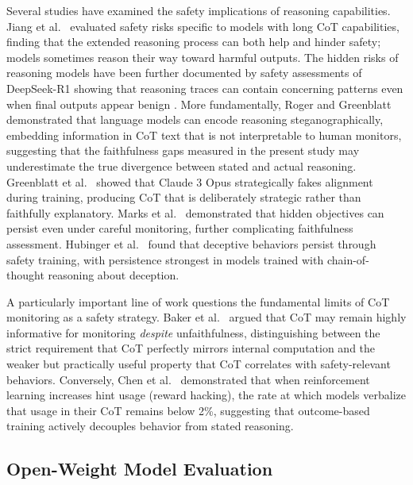 Several studies have examined the safety implications of reasoning capabilities.
Jiang et al.~\cite{jiang2025safechain} evaluated safety risks specific to models
with long CoT capabilities, finding that the extended reasoning process can both
help and hinder safety; models sometimes reason their way toward harmful outputs.
The hidden risks of reasoning models have been further documented by safety
assessments of DeepSeek-R1 showing that reasoning traces can contain concerning
patterns even when final outputs appear benign \cite{zhou2025hidden}. More
fundamentally, Roger and Greenblatt~\cite{roger2023steganography} demonstrated
that language models can encode reasoning steganographically, embedding information
in CoT text that is not interpretable to human monitors, suggesting that the
faithfulness gaps measured in the present study may underestimate the true
divergence between stated and actual reasoning. Greenblatt et al.~\cite{greenblatt2024alignment} showed that
Claude 3 Opus strategically fakes alignment during training, producing CoT that is
deliberately strategic rather than faithfully explanatory. Marks et al.~\cite{marks2025auditing} demonstrated that hidden objectives can persist even under careful monitoring, further complicating faithfulness assessment. Hubinger et
al.~\cite{hubinger2024sleeper} found that deceptive behaviors persist through
safety training, with persistence strongest in models trained with chain-of-thought
reasoning about deception.

A particularly important line of work questions the fundamental limits of CoT
monitoring as a safety strategy. Baker et al.~\cite{baker2025cot} argued that CoT
may remain highly informative for monitoring \emph{despite} unfaithfulness,
distinguishing between the strict requirement that CoT perfectly mirrors internal
computation and the weaker but practically useful property that CoT correlates
with safety-relevant behaviors. Conversely, Chen et al.~\cite{chen2025reasoning}
demonstrated that when reinforcement learning increases hint usage (reward hacking),
the rate at which models verbalize that usage in their CoT remains below 2\%,
suggesting that outcome-based training actively decouples behavior from stated
reasoning.

\subsection{Open-Weight Model Evaluation}

